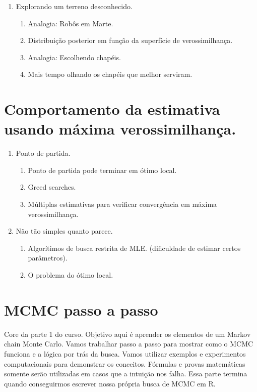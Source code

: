 \documentclass[10pt,a4paper]{article}
\begin{document}
\begin{enumerate}
\item Explorando um terreno desconhecido.
	\begin{enumerate}
	\item Analogia: Robôs em Marte.
	\item Distribuição posterior em função da superfície de verossimilhança.
	\item Analogia: Escolhendo chapéis.
	\item Mais tempo olhando os chapéis que melhor serviram.
	\end{enumerate}
\end{enumerate}

\section{Comportamento da estimativa usando máxima verossimilhança.}

\begin{enumerate}
\item Ponto de partida.
	\begin{enumerate}
	\item Ponto de partida pode terminar em ótimo local.
	\item Greed searches.
	\item Múltiplas estimativas para verificar convergência em máxima verossimilhança.	
	\end{enumerate}
	
\item Não tão simples quanto parece.
	\begin{enumerate}
	\item Algorítimos de busca restrita de MLE. (dificuldade de estimar certos parâmetros).
	\item O problema do ótimo local.
	\end{enumerate}
\end{enumerate}

\section{MCMC passo a passo}

Core da parte 1 do curso. Objetivo aqui é aprender os elementos de um Markov chain Monte Carlo. Vamos trabalhar passo a passo para mostrar como o MCMC funciona e a lógica por trás da busca. Vamos utilizar exemplos e experimentos computacionais para demonstrar os conceitos. Fórmulas e provas matemáticas somente serão utilizadas em casos que a intuição nos falha. Essa parte termina quando conseguirmos escrever nossa própria busca de MCMC em R.
\end{document}
